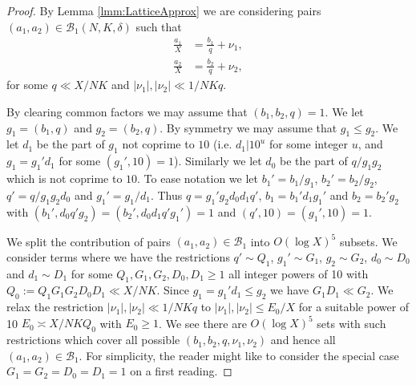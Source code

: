\documentclass[10pt]{amsart}
\theoremstyle{plain}
\numberwithin{sblmm}{thrm}
\numberwithin{equation}{section}
\begin{document}
\begin{proof}
%
By Lemma \ref{lmm:LatticeApprox} we are considering pairs $(a_1,a_2)\in\mathcal{B}_1(N,K,\delta)$ such that
%
\begin{align*}
\frac{a_1}{X}&=\frac{b_1}{q}+\nu_1,\\
\frac{a_2}{X}&=\frac{b_2}{q}+\nu_2,
\end{align*}
%
for some $q\ll X/N K$ and $|\nu_1|,|\nu_2|\ll 1/N K q$.

By clearing common factors we may assume that $(b_1,b_2,q)=1$. We let $g_1=(b_1,q)$ and $g_2=(b_2,q)$. By symmetry we may assume that $g_1\le g_2$. We let $d_1$ be the part of $g_1$ not coprime to $10$ (i.e. $d_1|10^u$ for some integer $u$, and $g_1=g_1'd_1$ for some $(g_1',10)=1$). Similarly we let $d_0$ be the part of $q/g_1g_2$ which is not coprime to $10$. To ease notation we let $b_1'=b_1/g_1$, $b_2'=b_2/g_2$, $q'=q/g_1g_2d_0$ and $g_1'=g_1/d_1$. Thus $q=g_1'g_2d_0d_1q'$, $b_1=b_1'd_1g_1'$ and $b_2=b_2'g_2$ with $(b_1',d_0 q' g_2)=(b_2',d_0 d_1 q' g_1')=1$ and $(q',10)=(g_1',10)=1$.

We split the contribution of pairs $(a_1,a_2)\in\mathcal{B}_1$ into $O(\log{X})^5$ subsets. We consider terms where we have the restrictions $q'\sim Q_1$, $g_1'\sim G_1$, $g_2\sim G_2$, $d_0\sim D_0$ and $d_1\sim D_1$  for some $Q_1,G_1,G_2,D_0,D_1 \ge 1$ all integer powers of 10 with $Q_0:=Q_1 G_1 G_2 D_0 D_1\ll X / N K$. Since $g_1=g_1'd_1\le g_2$ we have $G_1D_1\ll G_2$. We relax the restriction $|\nu_1|,|\nu_2|\ll 1/N K q$ to $|\nu_1|,|\nu_2|\le  E_0/X$ for a suitable power of 10 $E_0\asymp X/N K Q_0$ with $E_0\ge 1$. We see there are $O(\log{X})^5$ sets with such restrictions which cover all possible $(b_1,b_2,q,\nu_1,\nu_2)$ and hence all  $(a_1,a_2)\in\mathcal{B}_1$. For simplicity, the reader might like to consider the special case $G_1=G_2=D_0=D_1=1$ on a first reading.


\end{proof}
\end{document}
